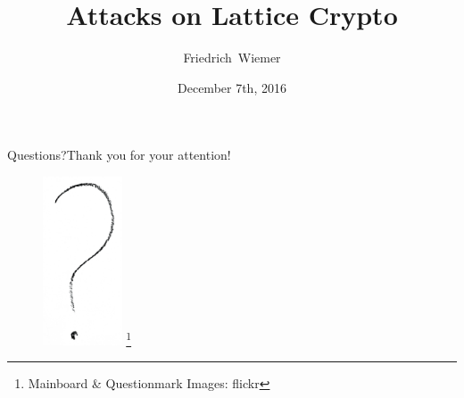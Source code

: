 \documentclass[12pt,mathserif,professionalfont]{beamer}
\title{Attacks on Lattice Crypto}
\subtitle{}
\author[Friedrich~Wiemer]{Friedrich~Wiemer}
\institute{%
    FluxFingers\\[0.5em]
    Workgroup Symmetric Cryptography\\
    Ruhr University Bochum
}
\date{December 7th, 2016}
\newcommand{\blfootnote}[1]{%
    \begingroup
        \renewcommand\thefootnote{}\footnote{#1}%
        \addtocounter{footnote}{-1}%
    \endgroup
}
\begin{document}
\begin{frame}
    \titlepage{}
\end{frame}




\begin{frame}{Questions?}{Thank you for your attention!}
    \begin{figure}[!htb]
        \includegraphics[height=50mm]{data/flickr/questionmark.png}\blfootnote{\scriptsize Mainboard \& Questionmark Images: flickr}
    \end{figure}
\end{frame}

\end{document}
